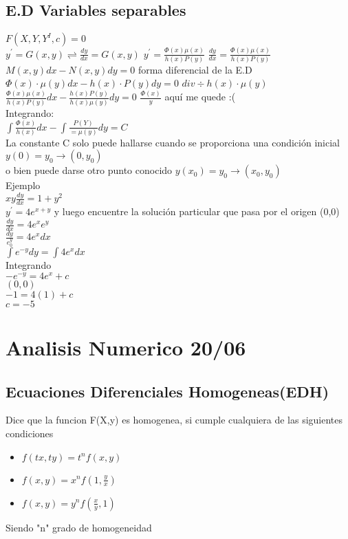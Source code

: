 \documentclass[12pt]{article}
\begin{document}
  \subsection{E.D Variables separables}
  $F(X,Y,Y^I,c)=0$
  \\ $y^\prime=G(x,y)\rightleftharpoons\frac{dy}{dx}=G(x,y)$
  $y^\prime=\frac{\Phi(x)\mu(x)}{h(x)P(y)}$
  $\frac{dy}{dx}=\frac{\Phi(x)\mu(x)}{h(x)P(y)}$
  $M(x,y)dx - N(x,y)dy = 0$
  forma diferencial de la E.D
  $\Phi(x)\cdot\mu(y)dx-h(x)\cdot P(y)dy=0$
  $div\div h(x)\cdot\mu(y)$
  $\frac{\Phi(x)\mu(x)}{h(x)P(y)}dx-\frac{h(x)P(y)}{h(x)\mu (y)}dy=0$  
  $\frac{\Phi(x)}{y}$ aquí me quede :(
  \\Integrando:
  \\$\int\frac{\Phi(x)}{h(x)}dx-\int\frac{P(Y)}{=\mu(y)}dy=C$
  \\La constante C solo puede hallarse cuando se proporciona una condición inicial $y(0)=y_0\rightarrow (0,y_0)$
  \\o bien puede darse otro punto conocido $y(x_0)=y_0\rightarrow (x_0,y_0)$
  \\Ejemplo
  \\$xy\frac{dy}{dx}=1+y^2$ 
  \\$y^\prime=4e^{x+y}$ y luego encuentre la solución particular que pasa por el origen (0,0)
  \\$\frac{dy}{dx}=4e^x e^y$
  \\$\frac{dy}{e^y_0}=4e^x dx$
  \\$\int e^{-y}dy=\int 4 e^x dx$
  \\Integrando
  \\$-e^{-y}=4e^x +c$
  \\$(0,0)$
  \\$-1=4(1)+c$
  \\$c= -5$
 
  \newpage
  \section{Analisis Numerico 20/06}
\subsection{Ecuaciones Diferenciales Homogeneas(EDH)}
 Dice que la funcion F(X,y) es homogenea, si cumple cualquiera de las siguientes condiciones
\begin{itemize}
  \item $f(tx,ty)=t^n f(x,y)$
  \item $f(x,y)=x^n f(1,\frac{y}{x})$
  \item $f(x,y)=y^n f(\frac{x}{y},1)$
\end{itemize}
Siendo "n" grado de homogeneidad
\end{document}

